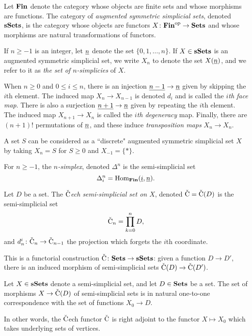 \documentclass{amsart}
\def\Cech{$\check{\tn{C}}$ech }
\def\C{\check{\tn{C}}}
\def\Fin{{\bf Fin}}
\def\singleton{\{*\}}
\begin{document}
\begin{definition}\label{def:sSets}

Let $\Fin$ denote the category whose objects are finite sets and whose morphisms are functions.  The category of {\em augmented symmetric simplicial sets}, denoted ${\bf sSets}$, is the category whose objects are functors $X\taking\Fin\op\to\Sets$ and whose morphisms are natural transformations of functors.

If $n\geq -1$ is an integer, let $\underline{n}$ denote the set $\{0,1,\ldots,n\}$.  If $X\in{\bf sSets}$ is an augmented symmetric simplicial set, we write $X_n$ to denote the set $X(\underline{n})$, and we refer to it as {\em the set of $n$-simplicies} of $X$.  

When $n\geq 0$ and $0\leq i\leq n$, there is an injection $\underline{n-1}\rightarrow\underline{n}$ given by skipping the $i$th element.  The induced map $X_n\to X_{n-1}$ is denoted $d_i$ and is called the {\em $i$th face map}.  There is also a surjection $\underline{n+1}\rightarrow\underline{n}$ given by repeating the $i$th element.  The induced map $X_{n+1}\to X_n$ is called the {\em $i$th degeneracy} map.  Finally, there are $(n+1)!$ permutations of $\underline{n}$, and these induce {\em transposition maps} $X_n\to X_n$.  

\end{definition}

\begin{example}\label{ex:sSets}

A set $S$ can be considered as a ``discrete" augmented symmetric simplicial set $X$ by taking $X_{n}=S$ for $S\geq 0$ and $X_{-1}=\singleton$.

For $n\geq -1$, the {\em $n$-simplex}, denoted $\Delta^n$ is the semi-simplicial set $$\Delta^n_i=\Hom_\Fin(\ul{i},\ul{n}).$$

\end{example}

\begin{definition}

Let $D$ be a set.  The {\em \Cech semi-simplicial set on $X$}, denoted $\C=\C(D)$ is the semi-simplicial set $$\C_n=\prod_{k=0}^n D,$$ and $d^i_n\taking\C_n\to\C_{n-1}$ the projection which forgets the $i$th coordinate.

This is a functorial construction $\C\taking\Sets\to\sSets$: given a function $D\to D'$, there is an induced morphism of semi-simplicial sets $\C(D)\to\C(D')$.

\end{definition}

\begin{proposition}

Let $X\in{\bf sSets}$ denote a semi-simplicial set, and let $D\in{\bf Sets}$ be a set.  The set of morphisms $X\to\C(D)$ of semi-simplicial sets is in natural one-to-one correspondence with the set of functions $X_0\to D$.  

In other words, the \Cech functor $\C$ is right adjoint to the functor $X\mapsto X_0$ which takes underlying sets of vertices.

\end{proposition}
\end{document}
